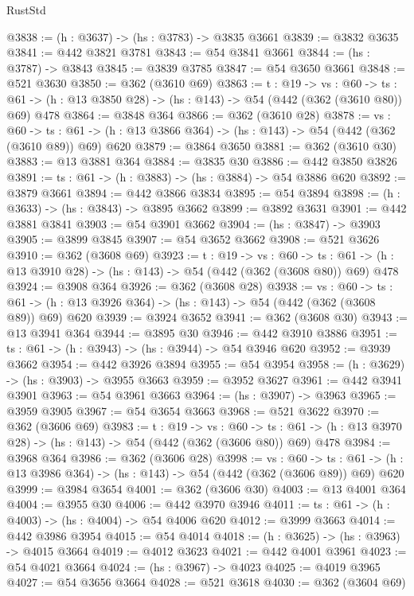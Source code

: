 \begin{lexlean}{RustStd}
\begin{coremodule}
@3838 := (h : @3637) -> (hs : @3783) -> @3835 @3661
@3839 := @3832 @3635
@3841 := @442 @3821 @3781
@3843 := @54 @3841 @3661
@3844 := (hs : @3787) -> @3843
@3845 := @3839 @3785
@3847 := @54 @3650 @3661
@3848 := @521 @3630
@3850 := @362 (@3610 @69)
@3863 := {t : @19} ->
  {vs : @60} ->
  {ts : @61} -> (h : @13 @3850 @28) -> (hs : @143) -> @54 (@442 (@362 (@3610 @80)) @69) @478
@3864 := @3848 @364
@3866 := @362 (@3610 @28)
@3878 := {vs : @60} ->
  {ts : @61} -> (h : @13 @3866 @364) -> (hs : @143) -> @54 (@442 (@362 (@3610 @89)) @69) @620
@3879 := @3864 @3650
@3881 := @362 (@3610 @30)
@3883 := @13 @3881 @364
@3884 := @3835 @30
@3886 := @442 @3850 @3826
@3891 := {ts : @61} -> (h : @3883) -> (hs : @3884) -> @54 @3886 @620
@3892 := @3879 @3661
@3894 := @442 @3866 @3834
@3895 := @54 @3894
@3898 := (h : @3633) -> (hs : @3843) -> @3895 @3662
@3899 := @3892 @3631
@3901 := @442 @3881 @3841
@3903 := @54 @3901 @3662
@3904 := (hs : @3847) -> @3903
@3905 := @3899 @3845
@3907 := @54 @3652 @3662
@3908 := @521 @3626
@3910 := @362 (@3608 @69)
@3923 := {t : @19} ->
  {vs : @60} ->
  {ts : @61} -> (h : @13 @3910 @28) -> (hs : @143) -> @54 (@442 (@362 (@3608 @80)) @69) @478
@3924 := @3908 @364
@3926 := @362 (@3608 @28)
@3938 := {vs : @60} ->
  {ts : @61} -> (h : @13 @3926 @364) -> (hs : @143) -> @54 (@442 (@362 (@3608 @89)) @69) @620
@3939 := @3924 @3652
@3941 := @362 (@3608 @30)
@3943 := @13 @3941 @364
@3944 := @3895 @30
@3946 := @442 @3910 @3886
@3951 := {ts : @61} -> (h : @3943) -> (hs : @3944) -> @54 @3946 @620
@3952 := @3939 @3662
@3954 := @442 @3926 @3894
@3955 := @54 @3954
@3958 := (h : @3629) -> (hs : @3903) -> @3955 @3663
@3959 := @3952 @3627
@3961 := @442 @3941 @3901
@3963 := @54 @3961 @3663
@3964 := (hs : @3907) -> @3963
@3965 := @3959 @3905
@3967 := @54 @3654 @3663
@3968 := @521 @3622
@3970 := @362 (@3606 @69)
@3983 := {t : @19} ->
  {vs : @60} ->
  {ts : @61} -> (h : @13 @3970 @28) -> (hs : @143) -> @54 (@442 (@362 (@3606 @80)) @69) @478
@3984 := @3968 @364
@3986 := @362 (@3606 @28)
@3998 := {vs : @60} ->
  {ts : @61} -> (h : @13 @3986 @364) -> (hs : @143) -> @54 (@442 (@362 (@3606 @89)) @69) @620
@3999 := @3984 @3654
@4001 := @362 (@3606 @30)
@4003 := @13 @4001 @364
@4004 := @3955 @30
@4006 := @442 @3970 @3946
@4011 := {ts : @61} -> (h : @4003) -> (hs : @4004) -> @54 @4006 @620
@4012 := @3999 @3663
@4014 := @442 @3986 @3954
@4015 := @54 @4014
@4018 := (h : @3625) -> (hs : @3963) -> @4015 @3664
@4019 := @4012 @3623
@4021 := @442 @4001 @3961
@4023 := @54 @4021 @3664
@4024 := (hs : @3967) -> @4023
@4025 := @4019 @3965
@4027 := @54 @3656 @3664
@4028 := @521 @3618
@4030 := @362 (@3604 @69)

\end{coremodule}
\end{lexlean}

